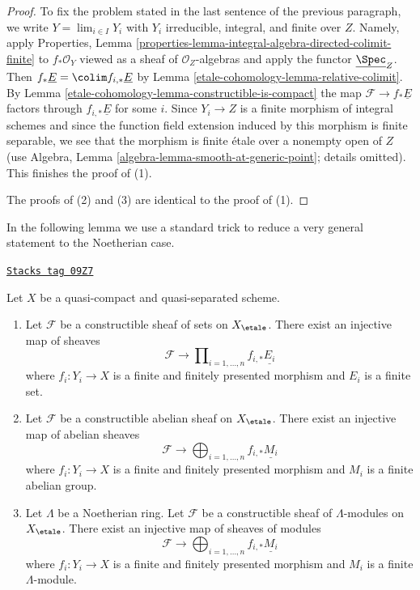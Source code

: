 \begin{proof}
\medskip\noindent
To fix the problem stated in the last sentence of the previous paragraph,
we write $Y = \lim_{i \in I} Y_i$ with $Y_i$ irreducible, integral, and
finite over $Z$. Namely, apply Properties, Lemma
\ref{properties-lemma-integral-algebra-directed-colimit-finite}
to $f_*\mathcal{O}_Y$ viewed as a sheaf of $\mathcal{O}_Z$-algebras
and apply the functor $\underline{\Spec}_Z$.
Then $f_*\underline{E} = \colim f_{i, *}\underline{E}$
by Lemma \ref{etale-cohomology-lemma-relative-colimit}.
By Lemma \ref{etale-cohomology-lemma-constructible-is-compact} the map
$\mathcal{F} \to f_*\underline{E}$
factors through $f_{i, *}\underline{E}$ for some $i$.
Since $Y_i \to Z$ is a finite morphism of integral schemes
and since the function field extension
induced by this morphism is finite separable, we see that the
morphism is finite \'etale over a nonempty open of $Z$ (use
Algebra, Lemma \ref{algebra-lemma-smooth-at-generic-point}; details omitted).
This finishes the proof of (1).

\medskip\noindent
The proofs of (2) and (3) are identical to the proof of (1).
\end{proof}

In the following lemma we use a standard trick to reduce a very general
statement to the Noetherian case.

\begin{lemma}
\label{etale-cohomology-lemma-constructible-maps-into-constant-general}
\href{https://stacks.math.columbia.edu/tag/09Z7}{\texttt{Stacks tag 09Z7}}

\begin{reference}
\cite[Exposee IX, Proposition 2.14]{SGA4}
\end{reference}
Let $X$ be a quasi-compact and quasi-separated scheme.
\begin{enumerate}
\item Let $\mathcal{F}$ be a constructible sheaf of sets on $X_\etale$.
There exist an injective map of sheaves
$$
\mathcal{F} \longrightarrow
\prod\nolimits_{i = 1, \ldots, n} f_{i, *}\underline{E_i}
$$
where $f_i : Y_i \to X$ is a finite and finitely presented morphism and
$E_i$ is a finite set.
\item Let $\mathcal{F}$ be a constructible abelian sheaf on $X_\etale$.
There exist an injective map of abelian sheaves
$$
\mathcal{F} \longrightarrow
\bigoplus\nolimits_{i = 1, \ldots, n} f_{i, *}\underline{M_i}
$$
where $f_i : Y_i \to X$ is a finite and finitely presented morphism and
$M_i$ is a finite abelian group.
\item Let $\Lambda$ be a Noetherian ring.
Let $\mathcal{F}$ be a constructible sheaf of $\Lambda$-modules on $X_\etale$.
There exist an injective map of sheaves of modules
$$
\mathcal{F} \longrightarrow
\bigoplus\nolimits_{i = 1, \ldots, n} f_{i, *}\underline{M_i}
$$
where $f_i : Y_i \to X$ is a finite and finitely presented morphism and
$M_i$ is a finite $\Lambda$-module.
\end{enumerate}
\end{lemma}

